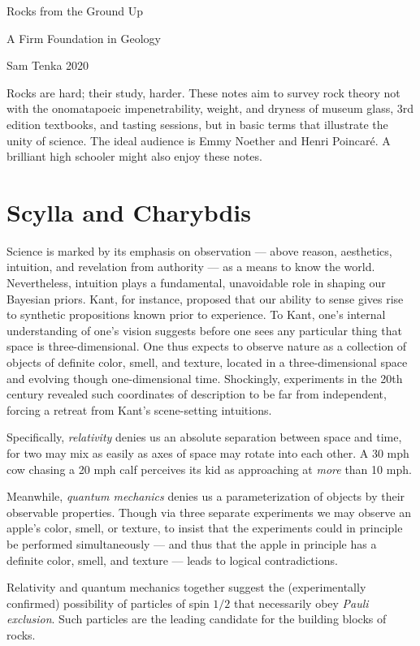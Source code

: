\documentclass[justified]{tufte-book}
\newcommand{\mtit}[3]{%
    \begin{adjustwidth}{0.0in}{-1.5in}
        \begin{center}
            \bf\sf
            {    \color{mblu}\vspace{0.0cm} \par \noindent \HUGE #1} 
            {\it \color{mblu}\vspace{0.3cm} \par \noindent \Huge #2}
            {\it             \vspace{0.3cm} \par \noindent \huge #3}
                             \vspace{0.6cm}
        \end{center}
    \end{adjustwidth}
}
\newcommand{\mchp}[1]{\let\clearpage\relax\chapter{\color{mblu}\textsf{#1}}}
\theoremstyle{definition}
\begin{document}
    \mtit{Rocks from the Ground Up}
         {A Firm Foundation in Geology}
         {Sam Tenka \hspace{1.0 cm} 2020}

    Rocks are hard; their study, harder.  These notes aim to survey rock theory
    not with the onomatapoeic impenetrability, weight, and dryness of museum
    glass, 3rd edition textbooks, and tasting sessions, but in basic terms that
    illustrate the unity of science.  The ideal audience is Emmy Noether and
    Henri Poincar\'e.  A brilliant high schooler might also enjoy these notes.

    \mchp{Scylla and Charybdis}

        Science is marked by its emphasis on observation --- above reason,
        aesthetics, intuition, and revelation from authority --- as a means to
        know the world.
        Nevertheless, intuition plays a fundamental, unavoidable role in
        shaping our Bayesian priors.
        Kant, for instance, proposed that our ability to sense gives rise to
        synthetic propositions known prior to experience.  To Kant, one's
        internal understanding of one's vision suggests before one sees any
        particular thing that space is three-dimensional.  One thus expects to
        observe nature as a collection of objects of definite color, smell, and
        texture, located in a three-dimensional space and evolving though
        one-dimensional time.
        Shockingly, experiments in the 20th century revealed such coordinates
        of description to be far from independent, forcing a retreat from
        Kant's scene-setting intuitions.

        Specifically, \emph{relativity} denies us an absolute separation
        between space and time, for two may mix as easily as axes of space may
        rotate into each other.  A 30 mph cow chasing a 20 mph calf
        perceives its kid as approaching at \emph{more} than 10 mph.  

        Meanwhile, \emph{quantum mechanics} denies us a parameterization of
        objects by their observable properties.  Though via three separate
        experiments we may observe an apple's color, smell, or texture, to
        insist that the experiments could in principle be performed
        simultaneously --- and thus that the apple in principle has a definite
        color, smell, and texture --- leads to logical contradictions. 

        Relativity and quantum mechanics together suggest the (experimentally
        confirmed) possibility of particles of spin $1/2$ that necessarily
        obey \emph{Pauli exclusion}.  Such particles are the leading candidate
        for the building blocks of rocks.
        
\end{document}

